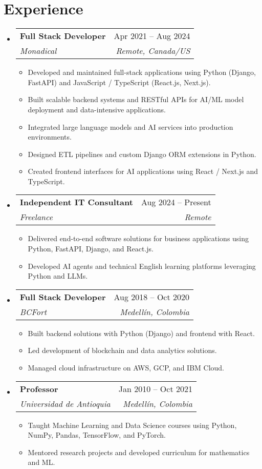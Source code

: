 \documentclass[letterpaper,11pt]{article}
\makeatletter
\newcommand{\resumeSubheading}[4]{
  \vspace{-2pt}
  \item[]
  \begin{tabular*}{\textwidth}{@{\extracolsep{\fill}}l r}
    \textbf{#1} & #2 \\
    \textit{#3} & \textit{#4} \\
  \end{tabular*}
  \vspace{-5pt}
}
\makeatother
\begin{document}
\section{Experience}
\begin{itemize}[leftmargin=0pt, itemindent=0pt, label={}, itemsep=1pt]
\resumeSubheading
{Full Stack Developer}{Apr 2021 -- Aug 2024}
{Monadical}{Remote, Canada/US}
\begin{itemize}[leftmargin=*, itemsep=0pt]
    \item Developed and maintained full-stack applications using Python (Django, FastAPI) and JavaScript / TypeScript (React.js, Next.js).
    \item Built scalable backend systems and RESTful APIs for AI/ML model deployment and data-intensive applications.
    \item Integrated large language models and AI services into production environments.
    \item Designed ETL pipelines and custom Django ORM extensions in Python.
    \item Created frontend interfaces for AI applications using React / Next.js and TypeScript.
\end{itemize}

\resumeSubheading
{Independent IT Consultant}{Aug 2024 -- Present}
{Freelance}{Remote}
\begin{itemize}[leftmargin=*, itemsep=0pt]
    \item Delivered end-to-end software solutions for business applications using Python, FastAPI, Django, and React.js.
    \item Developed AI agents and technical English learning platforms leveraging Python and LLMs.
\end{itemize}

\resumeSubheading
{Full Stack Developer}{Aug 2018 -- Oct 2020}
{BCFort}{Medellín, Colombia}
\begin{itemize}[leftmargin=*, itemsep=0pt]
    \item Built backend solutions with Python (Django) and frontend with React.
    \item Led development of blockchain and data analytics solutions.
    \item Managed cloud infrastructure on AWS, GCP, and IBM Cloud.
\end{itemize}

\resumeSubheading
{Professor}{Jan 2010 -- Oct 2021}
{Universidad de Antioquia}{Medellín, Colombia}
\begin{itemize}[leftmargin=*, itemsep=0pt]
    \item Taught Machine Learning and Data Science courses using Python, NumPy, Pandas, TensorFlow, and PyTorch.
    \item Mentored research projects and developed curriculum for mathematics and ML.
\end{itemize}
\end{itemize}
\end{document}
